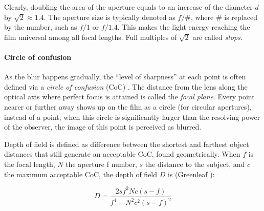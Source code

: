 Clearly, doubling the area of the aperture equals to an increase of the diameter $d$ by $\sqrt 2 \approx 1.4$.
The aperture size is typically denoted as $f/\#$, where $\#$ is replaced by the number, such as $f/1$ or $f/1.4$.
This makes the light energy reaching the film universal among all focal lengths.
Full multiples of $\sqrt 2$ are called \emph{stops}.
\cite{szeliski10vision}

\paragraph{Circle of confusion}
As the blur happens gradually, the ``level of sharpness'' at each point is often defined via a \emph{circle of confusion} (CoC) \cite{greenleaf1950photographic}.
The distance from the lens along the optical axis where perfect focus is attained is called the \emph{focal plane}.
Every point nearer or further away shows up on the film as a circle (for circular apertures), instead of a point; when this circle is significantly larger than the resolving power of the observer, the image of this point is perceived as blurred.

Depth of field is defined as difference between the shortest and farthest object distances that still generate an acceptable CoC, found geometrically.
When $f$ is the focal length, $N$ the aperture f number, $s$ the distance to the subject, and $c$ the maximum acceptable CoC, the depth of field $D$ is (Greenleaf \cite{greenleaf1950photographic}):

\begin{equation} \label{eq:dof}
	D = \frac{2 s f^2 N c (s - f)} {f^4 - N^2 c^2 (s - f)^2}
\end{equation}



